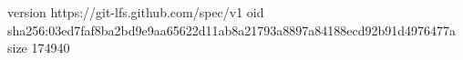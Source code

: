 version https://git-lfs.github.com/spec/v1
oid sha256:03ed7faf8ba2bd9e9aa65622d11ab8a21793a8897a84188ecd92b91d4976477a
size 174940
